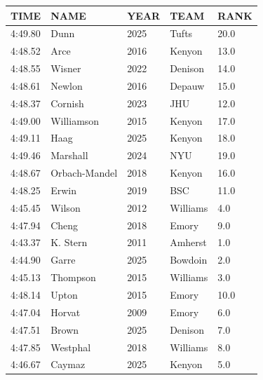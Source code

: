 \begin{table}[H]
\begin{minipage}[t]{0.48\textwidth}
\begin{tabular}{@{}p{1.8cm}p{2.8cm}p{1.2cm}p{1.4cm}p{0.8cm}@{}}
\hline
    \textbf{TIME} & \textbf{NAME} & \textbf{YEAR} & \textbf{TEAM} & \textbf{RANK} \\
\hline
    4:49.80 & Dunn & 2025 & Tufts & 20.0 \\
    4:48.52 & Arce & 2016 & Kenyon & 13.0 \\
    4:48.55 & Wisner & 2022 & Denison & 14.0 \\
    4:48.61 & Newlon & 2016 & Depauw & 15.0 \\
    4:48.37 & Cornish & 2023 & JHU & 12.0 \\
    4:49.00 & Williamson & 2015 & Kenyon & 17.0 \\
    4:49.11 & Haag & 2025 & Kenyon & 18.0 \\
    4:49.46 & Marshall & 2024 & NYU & 19.0 \\
    4:48.67 & Orbach-Mandel & 2018 & Kenyon & 16.0 \\
    4:48.25 & Erwin & 2019 & BSC & 11.0 \\
    4:45.45 & Wilson & 2012 & Williams & 4.0 \\
    4:47.94 & Cheng & 2018 & Emory & 9.0 \\
    4:43.37 & K. Stern & 2011 & Amherst & 1.0 \\
    4:44.90 & Garre & 2025 & Bowdoin & 2.0 \\
    4:45.13 & Thompson & 2015 & Williams & 3.0 \\
    4:48.14 & Upton & 2015 & Emory & 10.0 \\
    4:47.04 & Horvat & 2009 & Emory & 6.0 \\
    4:47.51 & Brown & 2025 & Denison & 7.0 \\
    4:47.85 & Westphal & 2018 & Williams & 8.0 \\
    4:46.67 & Caymaz & 2025 & Kenyon & 5.0 \\
\hline
\end{tabular}
\end{minipage}
\end{table}

